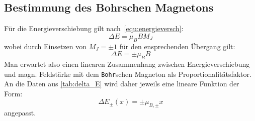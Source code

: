 \subsection{Bestimmung des Bohrschen Magnetons}
Für die Energieverschiebung gilt nach~\cref{equ:energieversch}:
\begin{equation*}
    \Delta E = \mu_B B M_J
\end{equation*}
wobei durch Einsetzen von $M_J = \pm 1$ für den ensprechenden Übergang gilt:
\begin{equation*}
    \Delta E = \pm \mu_B B
\end{equation*} 
Man erwartet also einen linearen Zusammenhang zwischen Energieverschiebung und magn. Feldstärke mit dem \texttt{Bohr}schen Magneton als Proportionalitätsfaktor. An die Daten aus \cref{tab:delta_E} wird daher jeweils eine lineare Funktion der Form:
\begin{equation}
    \Delta E_{\pm}(x) = \pm \mu_{B,\pm}x \label{equ:deltaE_fit}
\end{equation}
angepasst.
\begin{figure}[!ht]
    \centering
\end{figure}

